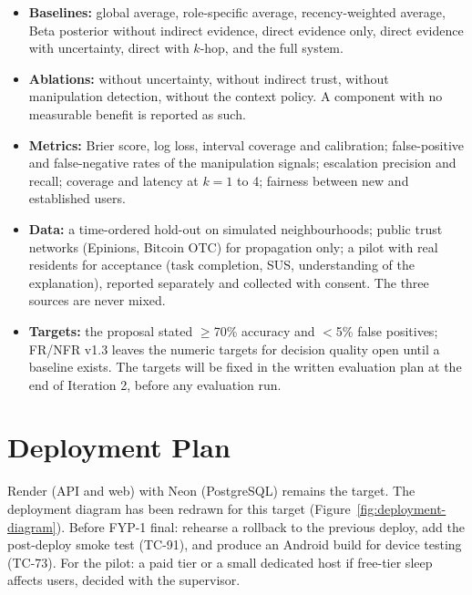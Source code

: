 \begin{itemize}
\item \textbf{Baselines:} global average, role-specific average, recency-weighted average, Beta posterior without indirect evidence, direct evidence only, direct evidence with uncertainty, direct with $k$-hop, and the full system.
\item \textbf{Ablations:} without uncertainty, without indirect trust, without manipulation detection, without the context policy. A component with no measurable benefit is reported as such.
\item \textbf{Metrics:} Brier score, log loss, interval coverage and calibration; false-positive and false-negative rates of the manipulation signals; escalation precision and recall; coverage and latency at $k=1$ to 4; fairness between new and established users.
\item \textbf{Data:} a time-ordered hold-out on simulated neighbourhoods; public trust networks (Epinions, Bitcoin OTC) for propagation only; a pilot with real residents for acceptance (task completion, SUS, understanding of the explanation), reported separately and collected with consent. The three sources are never mixed.
\item \textbf{Targets:} the proposal stated $\geq$70\% accuracy and $<$5\% false positives; FR/NFR v1.3 leaves the numeric targets for decision quality open until a baseline exists. The targets will be fixed in the written evaluation plan at the end of Iteration 2, before any evaluation run.
\end{itemize}

\section{Deployment Plan}\label{sec:deployment-plan}
Render (API and web) with Neon (PostgreSQL) remains the target. The deployment diagram has been redrawn for this target (Figure~\ref{fig:deployment-diagram}). Before FYP-1 final: rehearse a rollback to the previous deploy, add the post-deploy smoke test (TC-91), and produce an Android build for device testing (TC-73). For the pilot: a paid tier or a small dedicated host if free-tier sleep affects users, decided with the supervisor.

